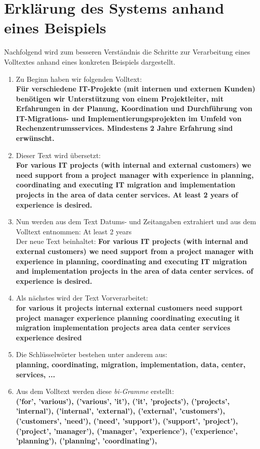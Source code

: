 \section{Erklärung des Systems anhand eines Beispiels}
Nachfolgend wird zum besseren Verständnis die Schritte zur Verarbeitung eines Volltextes anhand eines konkreten Beispiels dargestellt.\\
\begin{enumerate}
	\itemsep-0.15em
	\item Zu Beginn haben wir folgenden Volltext:\\ \textbf{Für verschiedene IT-Projekte (mit internen und externen Kunden) benötigen wir Unterstützung von einem Projektleiter, mit Erfahrungen in der Planung, Koordination und Durchführung von IT-Migrations- und Implementierungsprojekten im Umfeld von Rechenzentrumsservices. Mindestens 2 Jahre Erfahrung sind erwünscht.}
	\item Dieser Text wird übersetzt:\\ \textbf{For various IT projects (with internal and external customers) we need support from a project manager with experience in planning, coordinating and executing IT migration and implementation projects in the area of data center services. At least 2 years of experience is desired.}
	\item Nun werden aus dem Text Datums- und Zeitangaben extrahiert und aus dem Volltext entnommen: \grqq At least 2 years\grqq \\ Der neue Text beinhaltet: \textbf{For various IT projects (with internal and external customers) we need support from a project manager with experience in planning, coordinating and executing IT migration and implementation projects in the area of data center services. of experience is desired.}
	\item Als nächstes wird der Text Vorverarbeitet:\\ \textbf{for various it projects internal external customers need support project manager experience planning coordinating executing it migration implementation projects area data center services experience desired}
	\item Die Schlüsselwörter bestehen unter anderem aus:\\ \textbf{planning, coordinating, migration, implementation, data, center, services, ...}
	\item Aus dem Volltext werden diese \emph{bi-Gramme} erstellt:\\ \textbf{('for', 'various'), ('various', 'it'), ('it', 'projects'), ('projects', 'internal'), ('internal', 'external'), ('external', 'customers'), ('customers', 'need'), ('need', 'support'), ('support', 'project'), ('project', 'manager'), ('manager', 'experience'), ('experience', 'planning'), ('planning', 'coordinating'),
}
\end{enumerate}
